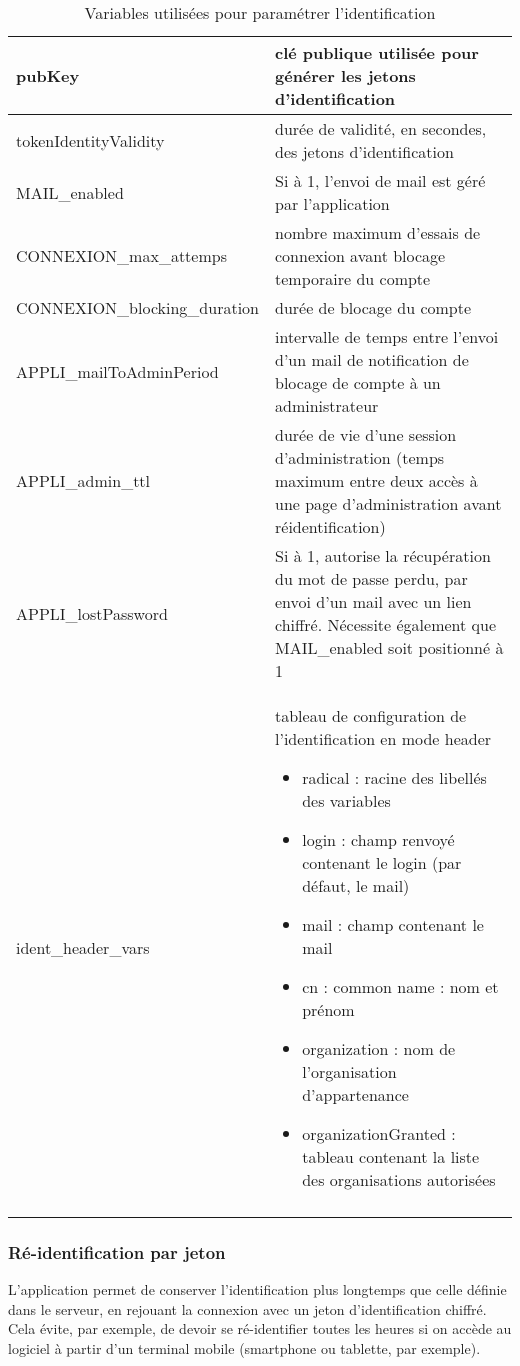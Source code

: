 \begin{longtable}{|p{6cm}|p{10cm}|}
\hline
pubKey & clé publique utilisée pour générer les jetons d'identification \\
\hline
tokenIdentityValidity & durée de validité, en secondes, des jetons d'identification\\
\hline
MAIL\_enabled & Si à 1, l'envoi de mail est géré par l'application \\
\hline
CONNEXION\_max\_attemps & nombre maximum d'essais de connexion avant blocage temporaire du compte \\
\hline
CONNEXION\_blocking\_duration & durée de blocage du compte \\
\hline
APPLI\_mailToAdminPeriod & intervalle de temps entre l'envoi d'un mail de notification de blocage de compte à un administrateur \\
\hline
APPLI\_admin\_ttl & durée de vie d'une session d'administration (temps maximum entre deux accès à une page d'administration avant réidentification) \\
\hline
APPLI\_lostPassword & Si à 1, autorise la récupération du mot de passe perdu, par envoi d'un mail avec un lien chiffré. Nécessite également que MAIL\_enabled soit positionné à 1 \\
\hline
ident\_header\_vars & tableau de configuration de l'identification en mode header
\begin{itemize}
	\item radical : racine des libellés des variables
	\item login : champ renvoyé contenant le login (par défaut, le mail)
	\item mail : champ contenant le mail
	\item cn : common name : nom et prénom
	\item organization : nom de l'organisation d'appartenance
	\item organizationGranted : tableau contenant la liste des organisations autorisées
\end{itemize}
\\
\hline

\caption{Variables utilisées pour paramétrer l'identification}
\end{longtable}

\subsubsection{Ré-identification par jeton}

L'application permet de conserver l'identification plus longtemps que celle définie dans le serveur, en rejouant la connexion avec un jeton d'identification chiffré. Cela évite, par exemple, de devoir se ré-identifier toutes les heures si on accède au logiciel à partir d'un terminal mobile (smartphone ou tablette, par exemple).

